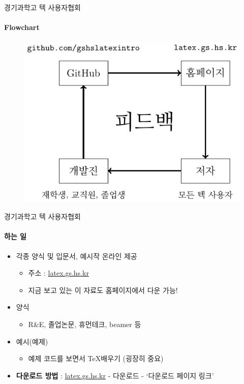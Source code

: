 \documentclass[12pt]{beamer}
\begin{document}
\begin{frame}{경기과학고 텍 사용자협회}
	\framesubtitle{Flowchart}
	\begin{figure}[h]
		\centering
		\includegraphics[width=\textwidth]{gshstexsociety_structure.pdf}
	\end{figure}
\end{frame}
\begin{frame}{경기과학고 텍 사용자협회}
	\framesubtitle{하는 일}
	\begin{itemize}
		\item 각종 양식 및 입문서, 예시작 온라인 제공
		\begin{itemize}
			\item 주소 : \url{latex.gs.hs.kr}
			\item 지금 보고 있는 이 자료도 홈페이지에서 다운 가능!
		\end{itemize}
		\item 양식
		\begin{itemize}
			\item R\&E, 졸업논문, 휴먼테크, beamer 등
		\end{itemize}
		\item 예시(예제)
		\begin{itemize}
			\item 예제 코드를 보면서 \TeX 배우기 (굉장히 중요)
		\end{itemize}
		\vspace{1cm}
		\item {\scriptsize \textbf{다운로드 방법} : \url{latex.gs.hs.kr} - 다운로드 - `다운로드 페이지 링크'}
	\end{itemize}
\end{frame}
\end{document}
